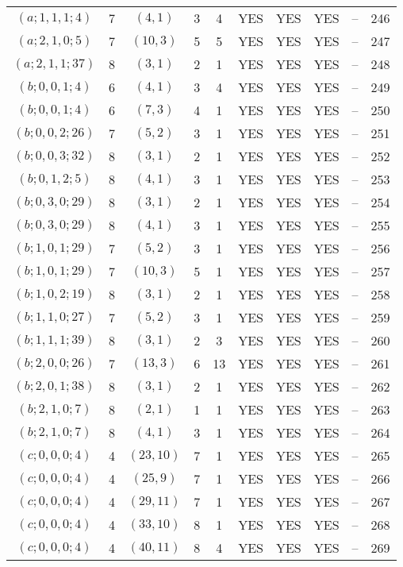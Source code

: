 \begin{longtable}{|c|c|c|c|c|c|c|c|c|c|}
$(a; 1, 1, 1; 4)$ & 7 & $(4, 1)$ & 3 & 4 & YES & YES & YES & -- & 246\\
$(a; 2, 1, 0; 5)$ & 7 & $(10, 3)$ & 5 & 5 & YES & YES & YES & -- & 247\\
$(a; 2, 1, 1; 37)$ & 8 & $(3, 1)$ & 2 & 1 & YES & YES & YES & -- & 248\\
$(b; 0, 0, 1; 4)$ & 6 & $(4, 1)$ & 3 & 4 & YES & YES & YES & -- & 249\\
$(b; 0, 0, 1; 4)$ & 6 & $(7, 3)$ & 4 & 1 & YES & YES & YES & -- & 250\\
$(b; 0, 0, 2; 26)$ & 7 & $(5, 2)$ & 3 & 1 & YES & YES & YES & -- & 251\\
$(b; 0, 0, 3; 32)$ & 8 & $(3, 1)$ & 2 & 1 & YES & YES & YES & -- & 252\\
$(b; 0, 1, 2; 5)$ & 8 & $(4, 1)$ & 3 & 1 & YES & YES & YES & -- & 253\\
$(b; 0, 3, 0; 29)$ & 8 & $(3, 1)$ & 2 & 1 & YES & YES & YES & -- & 254\\
$(b; 0, 3, 0; 29)$ & 8 & $(4, 1)$ & 3 & 1 & YES & YES & YES & -- & 255\\
$(b; 1, 0, 1; 29)$ & 7 & $(5, 2)$ & 3 & 1 & YES & YES & YES & -- & 256\\
$(b; 1, 0, 1; 29)$ & 7 & $(10, 3)$ & 5 & 1 & YES & YES & YES & -- & 257\\
$(b; 1, 0, 2; 19)$ & 8 & $(3, 1)$ & 2 & 1 & YES & YES & YES & -- & 258\\
$(b; 1, 1, 0; 27)$ & 7 & $(5, 2)$ & 3 & 1 & YES & YES & YES & -- & 259\\
$(b; 1, 1, 1; 39)$ & 8 & $(3, 1)$ & 2 & 3 & YES & YES & YES & -- & 260\\
$(b; 2, 0, 0; 26)$ & 7 & $(13, 3)$ & 6 & 13 & YES & YES & YES & -- & 261\\
$(b; 2, 0, 1; 38)$ & 8 & $(3, 1)$ & 2 & 1 & YES & YES & YES & -- & 262\\
$(b; 2, 1, 0; 7)$ & 8 & $(2, 1)$ & 1 & 1 & YES & YES & YES & -- & 263\\
$(b; 2, 1, 0; 7)$ & 8 & $(4, 1)$ & 3 & 1 & YES & YES & YES & -- & 264\\
$(c; 0, 0, 0; 4)$ & 4 & $(23, 10)$ & 7 & 1 & YES & YES & YES & -- & 265\\
$(c; 0, 0, 0; 4)$ & 4 & $(25, 9)$ & 7 & 1 & YES & YES & YES & -- & 266\\
$(c; 0, 0, 0; 4)$ & 4 & $(29, 11)$ & 7 & 1 & YES & YES & YES & -- & 267\\
$(c; 0, 0, 0; 4)$ & 4 & $(33, 10)$ & 8 & 1 & YES & YES & YES & -- & 268\\
$(c; 0, 0, 0; 4)$ & 4 & $(40, 11)$ & 8 & 4 & YES & YES & YES & -- & 269\\

\end{longtable}
